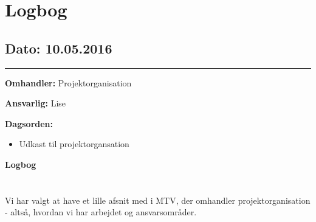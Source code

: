 \chapter{Logbog}

\section{Dato: 10.05.2016}
\hrule

\textbf{Omhandler:} Projektorganisation

\textbf{Ansvarlig:} Lise

\textbf{Dagsorden:}
\begin{itemize}
	\item Udkast til projektorgansation
\end{itemize}

\textbf{Logbog}
\\
\\ \\
Vi har valgt at have et lille afsnit med i MTV, der omhandler projektorganisation - altså, hvordan vi har arbejdet og ansvarsområder. 



